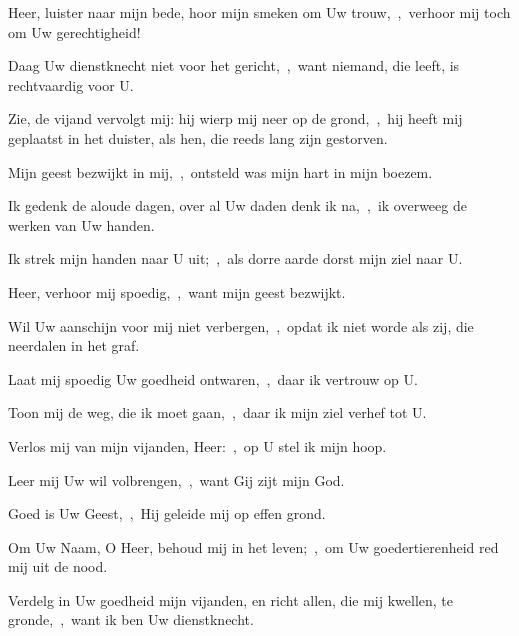\documentclass[12pt,twoside,a5paper]{article}
\begin{document}
\begin{halfparskip}
  Heer, luister naar mijn bede, hoor mijn smeken om Uw trouw,~\sep\ verhoor mij toch om Uw gerechtigheid!


  Daag Uw dienstknecht niet voor het gericht,~\sep\ want niemand, die leeft, is rechtvaardig voor U.

  Zie, de vijand vervolgt mij: hij wierp mij neer op de grond,~\sep\ hij heeft mij geplaatst in het duister, als hen, die reeds lang zijn gestorven.

  Mijn geest bezwijkt in mij,~\sep\ ontsteld was mijn hart in mijn boezem.

  Ik gedenk de aloude dagen, over al Uw daden denk ik na,~\sep\ ik overweeg de werken van Uw handen.

  Ik strek mijn handen naar U uit;~\sep\ als dorre aarde dorst mijn ziel naar U.

  Heer, verhoor mij spoedig,~\sep\ want mijn geest bezwijkt.

  Wil Uw aanschijn voor mij niet verbergen,~\sep\ opdat ik niet worde als zij, die neerdalen in het graf.

  Laat mij spoedig Uw goedheid ontwaren,~\sep\ daar ik vertrouw op U.

  Toon mij de weg, die ik moet gaan,~\sep\ daar ik mijn ziel verhef tot U.

  Verlos mij van mijn vijanden, Heer:~\sep\ op U stel ik mijn hoop.

  Leer mij Uw wil volbrengen,~\sep\ want Gij zijt mijn God.

  Goed is Uw Geest,~\sep\ Hij geleide mij op effen grond.

  Om Uw Naam, O Heer, behoud mij in het leven;~\sep\ om Uw goedertierenheid red mij uit de nood.

  Verdelg in Uw goedheid mijn vijanden, en richt allen, die mij kwellen, te gronde,~\sep\ want ik ben Uw dienstknecht.
\end{halfparskip}

\end{document}
